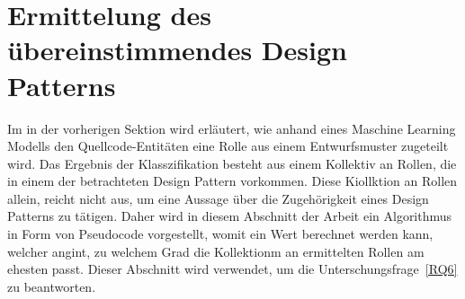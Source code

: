 \section{Ermittelung des übereinstimmendes Design Patterns}

Im in der vorherigen Sektion wird erläutert, wie anhand eines Maschine Learning Modells den Quellcode-Entitäten eine Rolle aus einem Entwurfsmuster zugeteilt wird.
Das Ergebnis der Klasszifikation besteht aus einem Kollektiv an Rollen, die in einem der betrachteten Design Pattern vorkommen. Diese Kiollktion an Rollen allein, reicht nicht aus, um eine Aussage über die Zugehörigkeit eines Design Patterns zu tätigen.
Daher wird in diesem Abschnitt der Arbeit ein Algorithmus in Form von Pseudocode vorgestellt, womit ein Wert berechnet werden kann, welcher angint, zu welchem Grad die Kollektionm an ermittelten Rollen am ehesten passt.
Dieser Abschnitt wird verwendet, um die Unterschungsfrage~\ref{RQ6} zu beantworten.

